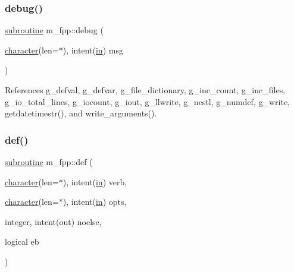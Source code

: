 \mbox{\label{namespacem__fpp_a6044fedc32afb4caa50f83a17d324e5b}} 
\subsubsection{\texorpdfstring{debug()}{debug()}}
{\footnotesize\ttfamily \hyperlink{M__stopwatch_83_8txt_acfbcff50169d691ff02d4a123ed70482}{subroutine} m\+\_\+fpp\+::debug (\begin{DoxyParamCaption}\item[{\hyperlink{option__stopwatch_83_8txt_abd4b21fbbd175834027b5224bfe97e66}{character}(len=$\ast$), intent(\hyperlink{M__journal_83_8txt_afce72651d1eed785a2132bee863b2f38}{in})}]{msg }\end{DoxyParamCaption})}



References g\+\_\+defval, g\+\_\+defvar, g\+\_\+file\+\_\+dictionary, g\+\_\+inc\+\_\+count, g\+\_\+inc\+\_\+files, g\+\_\+io\+\_\+total\+\_\+lines, g\+\_\+iocount, g\+\_\+iout, g\+\_\+llwrite, g\+\_\+nestl, g\+\_\+numdef, g\+\_\+write, getdatetimestr(), and write\+\_\+arguments().

\mbox{\label{namespacem__fpp_af80169d1e05b926eed9d4dbe10963084}} 
\subsubsection{\texorpdfstring{def()}{def()}}
{\footnotesize\ttfamily \hyperlink{M__stopwatch_83_8txt_acfbcff50169d691ff02d4a123ed70482}{subroutine} m\+\_\+fpp\+::def (\begin{DoxyParamCaption}\item[{\hyperlink{option__stopwatch_83_8txt_abd4b21fbbd175834027b5224bfe97e66}{character}(len=$\ast$), intent(\hyperlink{M__journal_83_8txt_afce72651d1eed785a2132bee863b2f38}{in})}]{verb,  }\item[{\hyperlink{option__stopwatch_83_8txt_abd4b21fbbd175834027b5224bfe97e66}{character}(len=$\ast$), intent(\hyperlink{M__journal_83_8txt_afce72651d1eed785a2132bee863b2f38}{in})}]{opts,  }\item[{integer, intent(out)}]{noelse,  }\item[{logical}]{eb }\end{DoxyParamCaption})}



